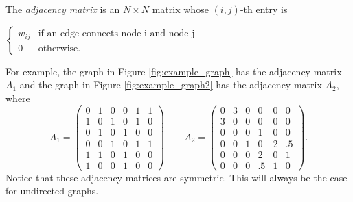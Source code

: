 \begin{definition} The \emph{adjacency matrix} is an $N \times N$ matrix whose $(i,j)$-th entry is
\begin{center}
	$ \begin{cases}  w_{ij} & \mbox{if an edge connects node i and node j} \\ 0 & \mbox{otherwise.} \end{cases}$
\end{center}
\end{definition}

For example, the graph in Figure \ref{fig:example_graph} has the adjacency matrix $A_1$ and the graph in Figure \ref{fig:example_graph2} has the adjacency matrix $A_2$, where
\[
A_1 = \begin{pmatrix}
0 & 1 & 0 & 0 & 1 & 1\\
1 & 0 & 1 & 0 & 1 & 0\\
0 & 1 & 0 & 1 & 0 & 0\\
0 & 0 & 1 & 0 & 1 & 1\\
1 & 1 & 0 & 1 & 0 & 0\\
1 & 0 & 0 & 1 & 0 & 0
\end{pmatrix} \qquad A_2 =
 \begin{pmatrix}
0 & 3 & 0 & 0 & 0 & 0\\
3 & 0 & 0 & 0 & 0 & 0\\
0 & 0 & 0 & 1 & 0 & 0\\
0 & 0 & 1 & 0 & 2 & .5\\
0 & 0 & 0 & 2 & 0 & 1\\
0 & 0 & 0 & .5 & 1 & 0
\end{pmatrix}.
\]
Notice that these adjacency matrices are symmetric. This will always be the case for undirected graphs.

